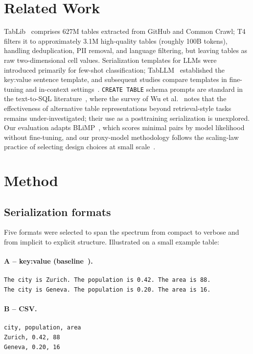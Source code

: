 \documentclass[11pt,a4paper]{article}
\begin{document}
\section{Related Work}
TabLib~\cite{tablib} comprises 627M tables extracted from GitHub and Common Crawl; T4~\cite{t4} filters it to approximately 3.1M high-quality tables (roughly 100B tokens), handling deduplication, PII removal, and language filtering, but leaving tables as raw two-dimensional cell values. Serialization templates for LLMs were introduced primarily for few-shot classification; TabLLM~\cite{tabllm} established the key:value sentence template, and subsequent studies compare templates in fine-tuning and in-context settings~\cite{jaitly,wang,ono}. \texttt{CREATE TABLE} schema prompts are standard in the text-to-SQL literature~\cite{spider,wu2025}, where the survey of Wu et al.~\cite{wu2025} notes that the effectiveness of alternative table representations beyond retrieval-style tasks remains under-investigated; their use as a posttraining serialization is unexplored. Our evaluation adapts BLiMP~\cite{blimp}, which scores minimal pairs by model likelihood without fine-tuning, and our proxy-model methodology follows the scaling-law practice of selecting design choices at small scale~\cite{chinchilla}.
\section{Method}
\label{sec:design}
\subsection{Serialization formats}
Five formats were selected to span the spectrum from compact to verbose and from implicit to explicit structure. Illustrated on a small example table:
\paragraph{A -- key:value (baseline~\cite{tabllm,t4}).}\mbox{}
\begin{lstlisting}
The city is Zurich. The population is 0.42. The area is 88.
The city is Geneva. The population is 0.20. The area is 16.
\end{lstlisting}
\paragraph{B -- CSV.}\mbox{}
\begin{lstlisting}
city, population, area
Zurich, 0.42, 88
Geneva, 0.20, 16
\end{lstlisting}
\end{document}
